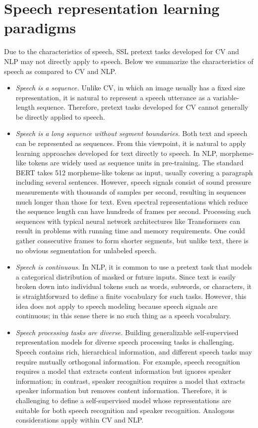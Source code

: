 
\section{Speech representation learning paradigms} \label{sec:approach}
Due to the characteristics of speech, SSL pretext tasks developed for CV
and NLP may not directly apply to speech.
Below we summarize the characteristics of speech as compared to CV and NLP.
\begin{itemize}
\item \textit{Speech is a sequence.} 
Unlike CV, in which an image usually has a fixed size representation, it is
natural to represent a speech utterance as a variable-length sequence. 
Therefore, pretext tasks developed for CV cannot generally be directly
applied to speech.

\item \textit{Speech is a long sequence without segment boundaries.} 
Both text and speech can be represented as sequences. From this viewpoint, it
is natural to apply learning approaches developed for text directly to
speech. 
In NLP, morpheme-like tokens are widely used as sequence units in
pre-training. The standard BERT takes 512 morpheme-like tokens as
input, usually covering a paragraph including several sentences. 
However, speech signals consist of sound pressure measurements with thousands
of samples per second, resulting in sequences much longer than those for text. Even
spectral representations which reduce the sequence length can have hundreds of
frames per second.
Processing such sequences with typical neural network architectures like
Transformers can result in problems with running time and memory requirements. 
One could gather consecutive frames to form shorter segments,
but unlike text, there is no obvious segmentation for unlabeled
speech.
\item \textit{Speech is continuous.} 
In NLP, it is common to use a pretext task that models a categorical
distribution of masked or future inputs. Since text is easily broken down into
individual tokens such as words, subwords, or characters, it is
straightforward to define a finite vocabulary for such tasks.
However, this idea does not apply to speech modeling because speech
signals are continuous; 
in this sense there is no such thing as a speech vocabulary. 
\item \textit{Speech processing tasks are diverse.}
Building generalizable self-supervised representation models for diverse speech
processing tasks is challenging.
Speech contains rich, hierarchical information, and different speech tasks
may require mutually orthogonal information.
For example, speech recognition requires a model that extracts content information
but ignores speaker information; in contrast, speaker recognition 
requires a model that extracts speaker information but removes content information.
Therefore, it is challenging to define a self-supervised model whose
representations are suitable for both speech recognition and speaker
recognition. Analogous considerations apply within CV and NLP.
\end{itemize}

